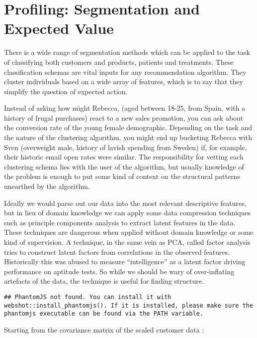 \documentclass[]{tufte-book}
\theoremstyle{definition}
\theoremstyle{definition}
\theoremstyle{definition}
\theoremstyle{remark}
\begin{document}
\hypertarget{profiling-segmentation-and-expected-value}{%
\section{Profiling: Segmentation and Expected Value}\label{profiling-segmentation-and-expected-value}}

There is a wide range of segmentation methods which can be applied to the task of classifying both customers and products, patients and treatments. These classification schemas are vital inputs for any recommendation algorithm. They cluster individuals based on a wide array of features, which is to say that they simplify the question of expected action.

Instead of asking how might Rebecca, (aged between 18-25, from Spain, with a history of frugal purchases) react to a new sales promotion, you can ask about the conversion rate of the young female demographic. Depending on the task and the nature of the clustering algorithm, you might end up bucketing Rebecca with Sven (overweight male, history of lavish spending from Sweden) if, for example, their historic email open rates were similar. The responsibility for vetting each clustering schema lies with the user of the algorithm, but usually knowledge of the problem is enough to put some kind of context on the structural patterns unearthed by the algorithm.

Ideally we would parse out our data into the most relevant descriptive features, but in lieu of domain knowledge we can apply some data compression techniques such as principle components analysis to extract latent features in the data. These techniques are dangerous when applied without domain knowledge or some kind of supervision. A technique, in the same vein as PCA, called factor analysis tries to construct latent factors from correlations in the observed features. Historically this was abused to measure ``intelligence'' as a latent factor driving performance on aptitude tests. So while we should be wary of over-inflating artefacts of the data, the technique is useful for finding structure.

\begin{verbatim}
## PhantomJS not found. You can install it with webshot::install_phantomjs(). If it is installed, please make sure the phantomjs executable can be found via the PATH variable.
\end{verbatim}

Starting from the covariance matrix of the scaled customer data :
\end{document}
